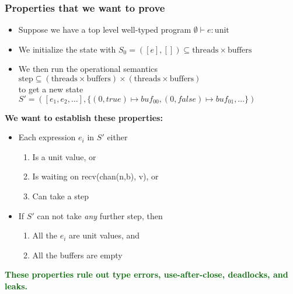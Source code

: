 \documentclass[aspectratio=169]{beamer}
\newcommand{\gemph}[1] {\textcolor{darkgreen}{\textbf{#1}}}
\begin{document}
\begin{frame}[fragile]
  \frametitle{Properties that we want to prove}
  \begin{itemize}
    \item Suppose we have a top level well-typed program $\emptyset \vdash e : \text{unit}$
    \item We initialize the state with $S_0 = ([e],[])\subseteq \text{threads}\times\text{buffers}$
    \item We then run the operational semantics $\text{step} \subseteq (\text{threads} \times \text{buffers})
              \times (\text{threads} \times \text{buffers})$ \\
          to get a new state $S' = ([e_1, e_2, \dots], \{(0,true) \mapsto buf_{00}, (0,false) \mapsto buf_{01}, \dots\})$
  \end{itemize}

  \bigskip
  \textbf{We want to establish these properties:}
  \begin{itemize}
    \item Each expression $e_i$ in $S'$ either
    \begin{enumerate}
      \item Is a unit value, or
      \item Is waiting on recv(chan(n,b), v), or
      \item Can take a step
    \end{enumerate}
    \item If $S'$ can not take \emph{any} further step, then
    \begin{enumerate}
      \item All the $e_i$ are unit values, and
      \item All the buffers are empty
    \end{enumerate}
  \end{itemize}
  \gemph{These properties rule out type errors, use-after-close, deadlocks, and leaks.}
\end{frame}
\end{document}
